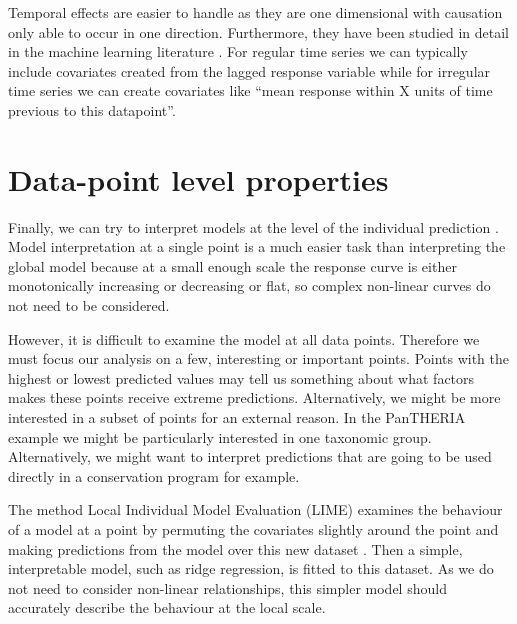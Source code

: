 \documentclass[10pt,]{article}
\begin{document}
Temporal effects are easier to handle as they are one dimensional with causation only able to occur in one direction.
Furthermore, they have been studied in detail in the machine learning literature \citep{jeong2008non}.
For regular time series we can typically include covariates created from the lagged response variable while for irregular time series we can create covariates like ``mean response within X units of time previous to this datapoint''.

\section{Data-point level properties}\label{data-point-level-properties}

Finally, we can try to interpret models at the level of the individual prediction \citep{lime, ribeiro2016should, lundberg2017unified, ribeiro2016nothing}.
Model interpretation at a single point is a much easier task than interpreting the global model because at a small enough scale the response curve is either monotonically increasing or decreasing or flat, so complex non-linear curves do not need to be considered.

However, it is difficult to examine the model at all data points.
Therefore we must focus our analysis on a few, interesting or important points.
Points with the highest or lowest predicted values may tell us something about what factors makes these points receive extreme predictions.
Alternatively, we might be more interested in a subset of points for an external reason.
In the PanTHERIA example we might be particularly interested in one taxonomic group.
Alternatively, we might want to interpret predictions that are going to be used directly in a conservation program for example.

The method Local Individual Model Evaluation (LIME) examines the behaviour of a model at a point by  permuting the covariates slightly around the point and making predictions from the model over this new dataset \citep{lime, ribeiro2016should, lundberg2017unified, ribeiro2016nothing}.
Then a simple, interpretable model, such as ridge regression, is fitted to this dataset.
As we do not need to consider non-linear relationships, this simpler model should accurately describe the behaviour at the local scale.
\end{document}
